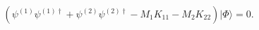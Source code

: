 \begin{equation}
\left(\psi^{(1)} \psi^{(1)\dag} + \psi^{(2)} \psi^{(2)\dag} - 
M_1K_{11} - M_2K_{22}\right) |\Phi \rangle =0.
\end{equation}

